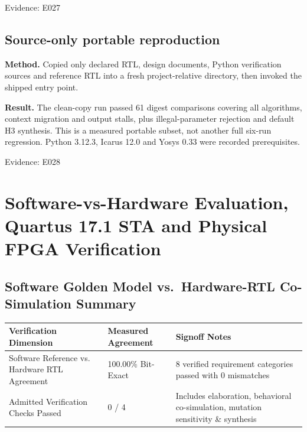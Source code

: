 \documentclass[11pt,a4paper]{article}
\begin{document}
{\small Evidence: E027}

\subsection{Source-only portable reproduction}

\textbf{Method.} Copied only declared RTL,\allowbreak{} design documents,\allowbreak{} Python verification sources and reference RTL into a fresh project-relative directory,\allowbreak{} then invoked the shipped entry point.

\textbf{Result.} The clean-copy run passed 61 digest comparisons covering all algorithms,\allowbreak{} context migration and output stalls,\allowbreak{} plus illegal-parameter rejection and default H3 synthesis. This is a measured portable subset,\allowbreak{} not another full six-run regression. Python 3.12.3,\allowbreak{} Icarus 12.0 and Yosys 0.33 were recorded prerequisites.

{\small Evidence: E028}

\section{Software-vs-Hardware Evaluation, Quartus 17.1 STA and Physical FPGA Verification}

\subsection{Software Golden Model vs.\ Hardware-RTL Co-Simulation Summary}

{\small\renewcommand{\arraystretch}{1.18}\begin{longtable}{@{}L{0.38\textwidth}|L{0.22\textwidth}|L{0.32\textwidth}@{}}\toprule

\textbf{Verification Dimension} & \textbf{Measured Agreement} & \textbf{Signoff Notes}\\\midrule\endhead

Software Reference vs. Hardware RTL Agreement & 100.00\% Bit-Exact & 8 verified requirement categories passed with 0 mismatches\\[2pt]\hline

Admitted Verification Checks Passed & 0 /\allowbreak{} 4 & Includes elaboration,\allowbreak{} behavioral co-simulation,\allowbreak{} mutation sensitivity \& synthesis\\[2pt]\hline

\bottomrule\end{longtable}}
\end{document}
